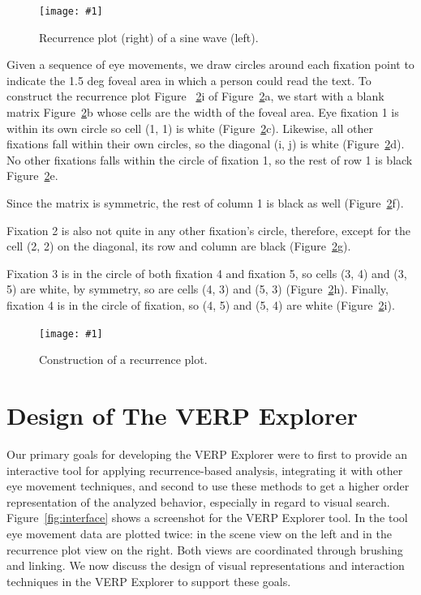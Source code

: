 \documentclass{sigchi}
\newcommand{\insertpicture}[2]{\begin{center}\texttt{[image: \#1]}\end{center}}
\begin{document}
\begin{figure}
	\insertpicture{figures/sine.pdf}{0.45}
	\caption{
    Recurrence plot (right) of a sine wave (left).
    \label{fig:sine}
    }
\end{figure}


Given a sequence of eye movements, we draw circles around each fixation
point to indicate the 1.5 deg foveal area in which a person could read the
text. To construct the recurrence plot Figure ~\ref{fig:construct}i of
Figure~\ref{fig:construct}a, we start with a blank matrix Figure~\ref{fig:construct}b whose cells are the width of the foveal area. Eye fixation 1  is within its own
circle so cell (1, 1) is white (Figure~\ref{fig:construct}c). Likewise, 
all other fixations fall within their own circles, so the diagonal (i, j) 
is white (Figure~\ref{fig:construct}d). No other fixations falls within 
the circle of fixation 1, so the rest of row 1 is black 
Figure~\ref{fig:construct}e. 

Since the matrix is symmetric, the rest of column 1 is black as well
(Figure~\ref{fig:construct}f). 

Fixation 2  is also not quite in any other fixation’s circle, therefore,
except for the cell (2, 2) on the diagonal, its row and column are black
(Figure~\ref{fig:construct}g). 

Fixation 3 is in the circle of both fixation 4  and fixation 5, so cells
(3, 4) and (3, 5) are white, by symmetry, so are cells (4, 3) and (5, 3)
(Figure~\ref{fig:construct}h). Finally, fixation 4 is in the circle of fixation,
so (4, 5) and (5, 4) are white (Figure~\ref{fig:construct}i).


\begin{figure}
	\insertpicture{figures/rpconstruction.pdf}{0.45}
	\caption{ Construction of a recurrence plot. \label{fig:construct}}
\end{figure}




\section{Design of The VERP Explorer}
Our primary goals for developing the VERP Explorer were to first to provide
an interactive tool for applying recurrence-based analysis, integrating it
with other eye movement techniques, and second to use these methods to get
a higher order representation of the analyzed behavior, especially in
regard to visual search. Figure~\ref{fig:interface} shows a screenshot 
for the VERP Explorer tool.  In the tool eye movement data are plotted 
twice: in the scene view on the left and in the recurrence plot view on the right.  
Both views are coordinated through brushing and linking. We now discuss the design of
visual representations and interaction techniques in the VERP Explorer to
support these goals. 
\end{document}
